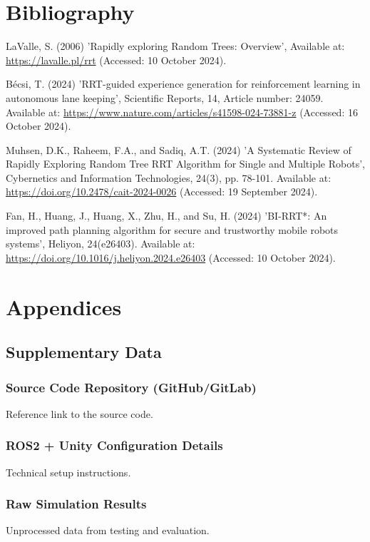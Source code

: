 \documentclass[a4paper,11pt]{report}
\begin{document}
\chapter{Bibliography}

\begin{thebibliography}{4}

     LaValle, S. (2006) 'Rapidly exploring Random Trees: Overview', Available at: \url{https://lavalle.pl/rrt} (Accessed: 10 October 2024).
    
     Bécsi, T. (2024) 'RRT-guided experience generation for reinforcement learning in autonomous lane keeping', Scientific Reports, 14, Article number: 24059. Available at: \url{https://www.nature.com/articles/s41598-024-73881-z} (Accessed: 16 October 2024).
    
     Muhsen, D.K., Raheem, F.A., and Sadiq, A.T. (2024) 'A Systematic Review of Rapidly Exploring Random Tree RRT Algorithm for Single and Multiple Robots', Cybernetics and Information Technologies, 24(3), pp. 78-101. Available at: \url{https://doi.org/10.2478/cait-2024-0026} (Accessed: 19 September 2024).
    
     Fan, H., Huang, J., Huang, X., Zhu, H., and Su, H. (2024) 'BI-RRT*: An improved path planning algorithm for secure and trustworthy mobile robots systems', Heliyon, 24(e26403). Available at: \url{https://doi.org/10.1016/j.heliyon.2024.e26403} (Accessed: 10 October 2024).
    
\end{thebibliography}

\newpage
 
\chapter{Appendices}
\section{Supplementary Data}
\subsection{Source Code Repository (GitHub/GitLab)}
Reference link to the source code.

\subsection{ROS2 + Unity Configuration Details}
Technical setup instructions.

\subsection{Raw Simulation Results}
Unprocessed data from testing and evaluation.
\end{document}
